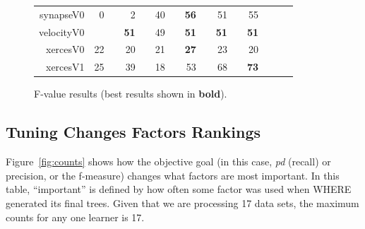 \documentclass{sig-alternative}
\newcommand{\rone}{}
\newcommand{\rtwo}{}
\newcommand{\rthree}{}
\newcommand{\rfour}{}
\newcommand{\fig}[1]{Figure~\ref{fig:#1}}
\begin{document}
\begin{figure}[!h]
\begin{tabular}{r|rl|rl|rl|rl|rl|rlrl}
synapseV0 & 0 &         & 2 &         & 40 & {\rthree} & {\bf 56} & {\rfour} & 51 & {\rfour} & 55 & {\rfour}\\
velocityV0 & {\bf 51 & {\rfour} & {\bf 51} & {\rfour} & 49 &         & {\bf 51} & {\rfour} & {\bf 51} & {\rfour} & {\bf 51} & {\rfour}\\
xercesV0 & 22 & {\rone} & 20 &         & 21 &         & {\bf 27} & {\rfour} & 23 & {\rtwo} & 20 &        \\
xercesV1 & 25 &         & 39 & {\rone} & 18 &         & 53 & {\rthree} & 68 & {\rfour} & {\bf 73} & {\rfour}\\
\end{tabular}
\caption{F-value results (best results  shown in {\bf bold}).}
\label{fig:fbars}
\end{figure}


\subsection{Tuning Changes Factors Rankings }\label{sect:rank}

\fig{counts} shows how the objective goal (in this case,
{\em pd} (recall) or precision, or the f-measure) changes what factors are most important.
In this table, ``important'' is defined by how often some factor was used when WHERE generated
its final trees. Given that we are processing 17 data sets, the maximum counts for any 
one learner is 17. 
\end{document}
